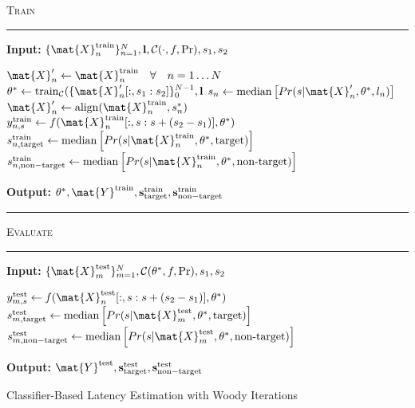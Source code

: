 \begin{algorithm}[H]
	\textsc{Train}
	\smallskip \hrule \smallskip
	\textbf{Input:} $\{\mat{X}_n^\mathrm{train}\}_{n=1}^N, \mathbf{l},
		\mathcal{C}(\cdot,f,\Pr), s_1, s_2$
	\begin{algorithmic}[1]
		\State $\mat{X}'_n \gets \mat{X}^\mathrm{train}_n \quad \forall \quad n=1\ldots
    N$
		\Repeat
		\State $\theta^* \gets \mathrm{train}_\mathcal{C}(\{\mat{X}'_n[:,s_1:s_2]\}_0^{N-1},\mathbf{l}$
    \State  $s_n \gets
			    \mathrm{median}\left[Pr(s|\mat{X}_n',\theta^*,l_n)\right]$
		\State $\mat{X}'_n \gets \mathrm{align}(\mat{X}^\mathrm{train}_n, s^*_n)$
		\EndFor
      \State $y_{n,s}^\mathrm{train} \gets
      f(\mat{X}_n^\mathrm{train}[:,s:s+(s_2-s_1)],\theta^*)$
        \EndFor
        \State $s_{n,\mathrm{target}}^\mathrm{train} \gets
			    \mathrm{median}\left[Pr(s|\mat{X}_n^\mathrm{train},\theta^*,\mathrm{target})\right]$
		    \State $s_{n,\mathrm{non-target}}^\mathrm{train}\gets
			    \mathrm{median}\left[Pr(s|\mat{X}_n^\mathrm{train},\theta^*,\textrm{non-target})\right]$
    \EndFor

	\end{algorithmic}
	\textbf{Output:} $\theta^*,
  \mat{Y}^\mathrm{train},
  \mathbf{s}_\mathrm{target}^\mathrm{train},
  \mathbf{s}_\mathrm{non-target}^\mathrm{train}$

	\smallskip \hrule \smallskip
	\textsc{Evaluate}
	\smallskip \hrule \smallskip
	\textbf{Input:} $\{\mat{X}_m^\mathrm{test}\}_{m=1}^N, \mathcal{C}(\theta^*,f, \Pr), s_1, s_2$
  \begin{algorithmic}[1]
      \State $y_{m,s}^\mathrm{test} \gets
      f(\mat{X}_n^\mathrm{test}[:,s:s+(s_2-s_1)],\theta^*)$
        \EndFor
        \State $s_{m,\mathrm{target}}^\mathrm{test} \gets
			    \mathrm{median}\left[Pr(s|\mat{X}_m^\mathrm{test},\theta^*,\mathrm{target})\right]$
		    \State $s_{m,\mathrm{non-target}}^\mathrm{test}\gets
			    \mathrm{median}\left[Pr(s|\mat{X}_m^\mathrm{test},\theta^*,\textrm{non-target})\right]$
    \EndFor
	\end{algorithmic}
  \textbf{Output:} $\mat{Y}^\mathrm{test},
  \mathbf{s}_\mathrm{target}^\mathrm{test},
  \mathbf{s}_\mathrm{non-target}^\mathrm{test}$
	\caption{Classifier-Based Latency Estimation with Woody Iterations}
	\label{alg:wcble}
\end{algorithm}

